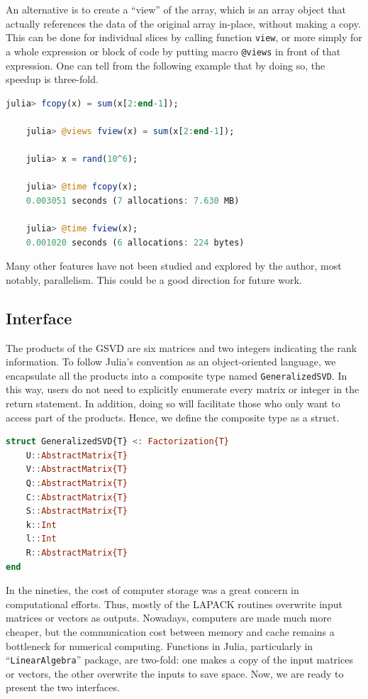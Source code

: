 An alternative is to create a ``view'' of the array, which is an array object that actually references the data of the original array in-place, without making a copy. This can be done for individual slices by calling function \texttt{view}, or more simply for a whole expression or block of code by putting macro \texttt{@views} in front of that expression. One can tell from the following example that by doing so, the speedup is three-fold. 
\begin{lstlisting}[language=julia, style=jlcodestyle]
	julia> fcopy(x) = sum(x[2:end-1]);

	julia> @views fview(x) = sum(x[2:end-1]);

	julia> x = rand(10^6);

	julia> @time fcopy(x);
  	0.003051 seconds (7 allocations: 7.630 MB)

	julia> @time fview(x);
  	0.001020 seconds (6 allocations: 224 bytes)
\end{lstlisting}

Many other features have not been studied and explored by the author, most notably, parallelism. This could be a good direction for future work. 

\subsection{Interface}
The products of the GSVD are six matrices and two integers indicating the rank information. To follow Julia's convention as an object-oriented language, we encapsulate all the products into a composite type named \texttt{GeneralizedSVD}. In this way, users do not need to explicitly enumerate every matrix or integer in the return statement. In addition, doing so will facilitate those who only want to access part of the products. Hence, we define the composite type as a struct. 

\begin{lstlisting}[language=julia, style=jlcodestyle]
struct GeneralizedSVD{T} <: Factorization{T}
    U::AbstractMatrix{T}
    V::AbstractMatrix{T}
    Q::AbstractMatrix{T}
    C::AbstractMatrix{T}
    S::AbstractMatrix{T}
    k::Int
    l::Int
    R::AbstractMatrix{T}
end
\end{lstlisting}

In the nineties, the cost of computer storage was a great concern in computational efforts. Thus, mostly of the LAPACK routines overwrite input matrices or vectors as outputs. Nowadays, computers are made much more cheaper, but the communication cost between memory and cache remains a bottleneck for numerical computing. Functions in Julia, particularly in ``\texttt{LinearAlgebra}'' package, are two-fold: one makes a copy of the input matrices or vectors, the other overwrite the inputs to save space. Now, we are ready to present the two interfaces.

